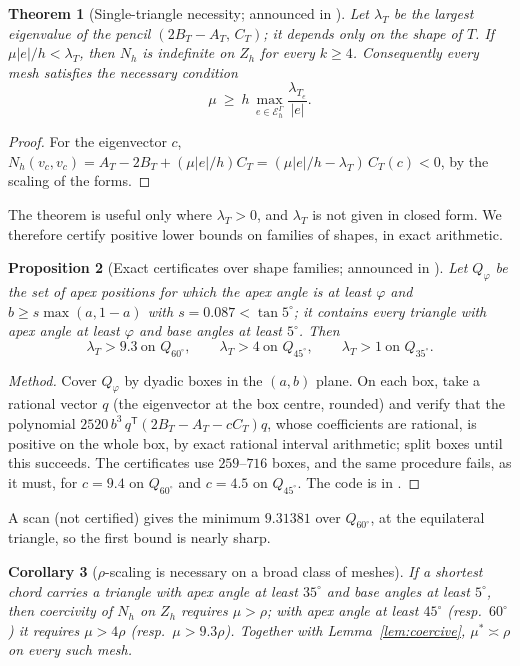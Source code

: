\documentclass[pdflatex,sn-mathphys-num]{sn-jnl}
\theoremstyle{thmstyleone}
\newtheorem{theorem}{Theorem}[section]
\newtheorem{proposition}[theorem]{Proposition}
\newtheorem{corollary}[theorem]{Corollary}
\theoremstyle{thmstylethree}
\newcommand{\EG}{\mathcal E_h^\Gamma}
\newcommand{\Zh}{Z_h}
\begin{document}
\begin{theorem}[Single-triangle necessity; announced in {\cite{CavalcantePadhiLetter}}]\label{thm:pb1}
Let $\lambda_T$ be the largest eigenvalue of the pencil $(2B_T-A_T,\,C_T)$; it depends only on the shape of $T$. If $\mu|e|/h<\lambda_T$, then $N_h$ is indefinite on $\Zh$ for every $k\ge4$. Consequently every mesh satisfies the necessary condition
\[
\mu\ \ge\ h\,\max_{e\in\EG}\frac{\lambda_{T_e}}{|e|} .
\]
\end{theorem}

\begin{proof}
For the eigenvector $c$, $N_h(v_c,v_c)=A_T-2B_T+(\mu|e|/h)C_T=(\mu|e|/h-\lambda_T)\,C_T(c)<0$, by the scaling of the forms.
\end{proof}

The theorem is useful only where $\lambda_T>0$, and $\lambda_T$ is not given in closed form. We therefore certify positive lower bounds on families of shapes, in exact arithmetic.

\begin{proposition}[Exact certificates over shape families; announced in {\cite{CavalcantePadhiLetter}}]\label{prop:cert}
Let $Q_\varphi$ be the set of apex positions for which the apex angle is at least $\varphi$ and $b\ge s\max(a,1-a)$ with $s=0.087<\tan5^\circ$; it contains every triangle with apex angle at least $\varphi$ and base angles at least $5^\circ$. Then
\[
\lambda_T>9.3\ \text{on }Q_{60^\circ},\qquad \lambda_T>4\ \text{on }Q_{45^\circ},\qquad \lambda_T>1\ \text{on }Q_{35^\circ}.
\]
\end{proposition}

\begin{proof}[Method]
Cover $Q_\varphi$ by dyadic boxes in the $(a,b)$ plane. On each box, take a rational vector $q$ (the eigenvector at the box centre, rounded) and verify that the polynomial $2520\,b^3\,q^{\mathsf T}(2B_T-A_T-cC_T)q$, whose coefficients are rational, is positive on the whole box, by exact rational interval arithmetic; split boxes until this succeeds. The certificates use $259$--$716$ boxes, and the same procedure fails, as it must, for $c=9.4$ on $Q_{60^\circ}$ and $c=4.5$ on $Q_{45^\circ}$. The code is in \cite{ZeroGradRepo}.
\end{proof}

A scan (not certified) gives the minimum $9.31381$ over $Q_{60^\circ}$, at the equilateral triangle, so the first bound is nearly sharp.

\begin{corollary}[$\rho$-scaling is necessary on a broad class of meshes]\label{cor:rho}
If a shortest chord carries a triangle with apex angle at least $35^\circ$ and base angles at least $5^\circ$, then coercivity of $N_h$ on $\Zh$ requires $\mu>\rho$; with apex angle at least $45^\circ$ (resp.\ $60^\circ$) it requires $\mu>4\rho$ (resp.\ $\mu>9.3\rho$). Together with Lemma~\ref{lem:coercive}, $\mu^\ast\asymp\rho$ on every such mesh.
\end{corollary}
\end{document}

